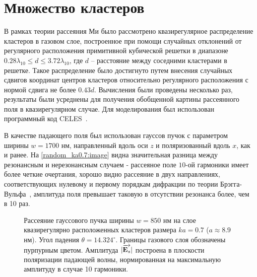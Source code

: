 \section{Множество кластеров}

В рамках теории рассеяния Ми было рассмотрено квазирегулярное распределение кластеров в газовом слое, построенное при помощи случайных отклонений от регулярного расположения примитивной кубической решетки в диапазоне $0.28\lambda_{10} \le d \le 3.72\lambda_{10}$, где $d$ -- расстояние между соседними кластерами в решетке. Такое распределение было достигнуто путем внесения случайных сдвигов координат центров кластеров относительно регулярного расположения с нормой сдвига не более $0.43d$. Вычисления были проведены несколько раз, результаты были усреднены для получения обобщенной картины рассеянного поля в квазирегулярном случае. Для моделирования был использован программный код CELES~\cite{celes}.

В качестве падающего поля был использован гауссов пучок с параметром ширины $w = 1700$ нм, направленный вдоль оси $z$ и поляризованный вдоль $x$, как и ранее. На \autoref{random_ka0.7:image} видна значительная разница между резонансным и нерезонансным случаем - рассеяное поле $10$-ой гармоники имеет более четкие очертания, хорошо видно рассеяние в двух направлениях, соответствующих нулевому и первому порядкам дифракции по теории Брэгга-Вульфа~\cite{boren_huffman}, амплитуда поля превышает таковую в отсутствии резонанса более, чем в 10 раз.

\begin{figure}[H]
    \hfil
    \caption{Рассеяние гауссового пучка ширины $w = 850$ нм на слое квазирегулярно расположенных кластеров размера $ka = 0.7$ ($a \approx 8.9$ нм). Угол падения $\theta = 14.324^{\circ}$. Границы газового слоя обозначены пурпурным цветом. Амплитуда $|\overrightarrow{\textbf{E}_{s}}|$ построена в плоскости поляризации падающей волны, нормированная на максимальную амплитуду в случае 10 гармоники.}
    \label{random_ka0.7:image}
\end{figure}

